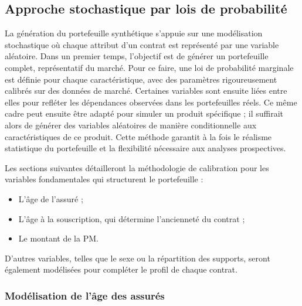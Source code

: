 \subsection{Approche stochastique par lois de probabilité}

La génération du portefeuille synthétique s'appuie sur une modélisation stochastique où chaque attribut d'un contrat est représenté par une variable aléatoire. Dans un premier temps, l'objectif est de générer un portefeuille complet, représentatif du marché. Pour ce faire, une loi de probabilité marginale est définie pour chaque caractéristique, avec des paramètres rigoureusement calibrés sur des données de marché. Certaines variables sont ensuite liées entre elles pour refléter les dépendances observées dans les portefeuilles réels. Ce même cadre peut ensuite être adapté pour simuler un produit spécifique ; il suffirait alors de générer des variables aléatoires de manière conditionnelle aux caractéristiques de ce produit. Cette méthode garantit à la fois le réalisme statistique du portefeuille et la flexibilité nécessaire aux analyses prospectives.

Les sections suivantes détailleront la méthodologie de calibration pour les variables fondamentales qui structurent le portefeuille :
\begin{itemize}
    \item L'âge de l'assuré ;
    \item L'âge à la souscription, qui détermine l'ancienneté du contrat ;
    \item Le montant de la PM.
\end{itemize}
D'autres variables, telles que le sexe ou la répartition des supports, seront également modélisées pour compléter le profil de chaque contrat.


\subsubsection{Modélisation de l'âge des assurés}

